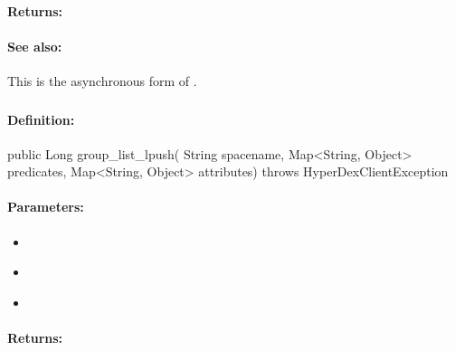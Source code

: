 \paragraph{Returns:}


\paragraph{See also:}  This is the asynchronous form of .

\pagebreak
\subsubsection{}
\label{api:java:group_list_lpush}


\paragraph{Definition:}
\begin{javacode}
public Long group_list_lpush(
        String spacename,
        Map<String, Object> predicates,
        Map<String, Object> attributes) throws HyperDexClientException
\end{javacode}

\paragraph{Parameters:}
\begin{itemize}[noitemsep]
\item {}\\

\item {}\\

\item {}\\

\end{itemize}

\paragraph{Returns:}


